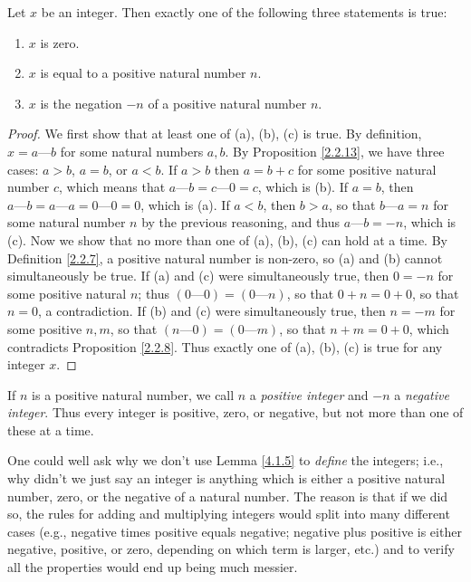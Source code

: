 \begin{lemma}\label{4.1.5}
    Let \(x\) be an integer.
    Then exactly one of the following three statements is true:
    \begin{enumerate}
        \item \(x\) is zero.
        \item \(x\) is equal to a positive natural number \(n\).
        \item \(x\) is the negation \(-n\) of a positive natural number \(n\).
    \end{enumerate}
\end{lemma}

\begin{proof}
    We first show that at least one of (a), (b), (c) is true.
    By definition, \(x = a \text{---} b\) for some natural numbers \(a, b\).
    By Proposition \ref{2.2.13}, we have three cases: \(a > b\), \(a = b\), or \(a < b\).
    If \(a > b\) then \(a = b + c\) for some positive natural number \(c\), which means that \(a \text{---} b = c \text{---} 0 = c\), which is (b).
    If \(a = b\), then \(a \text{---} b = a \text{---} a = 0 \text{---} 0 = 0\), which is (a).
    If \(a < b\), then \(b > a\), so that \(b \text{---} a = n\) for some natural number \(n\) by the previous reasoning, and thus \(a \text{---} b = -n\), which is (c).
    Now we show that no more than one of (a), (b), (c) can hold at a time.
    By Definition \ref{2.2.7}, a positive natural number is non-zero, so (a) and (b) cannot simultaneously be true.
    If (a) and (c) were simultaneously true, then \(0 = -n\) for some positive natural \(n\);
    thus \((0 \text{---} 0) = (0 \text{---} n)\), so that \(0 + n = 0 + 0\), so that \(n = 0\), a contradiction.
    If (b) and (c) were simultaneously true, then \(n = -m\) for some positive \(n, m\), so that \((n \text{---} 0) = (0 \text{---} m)\), so that \(n + m = 0 + 0\), which contradicts Proposition \ref{2.2.8}.
    Thus exactly one of (a), (b), (c) is true for any integer \(x\).
\end{proof}

\begin{note}
    If \(n\) is a positive natural number, we call \(n\) a \emph{positive integer} and \(-n\) a \emph{negative integer}.
    Thus every integer is positive, zero, or negative, but not more than one of these at a time.
\end{note}

\begin{note}
    One could well ask why we don’t use Lemma \ref{4.1.5} to \emph{define} the integers;
    i.e., why didn’t we just say an integer is anything which is either a positive natural number, zero, or the negative of a natural number.
    The reason is that if we did so, the rules for adding and multiplying integers would split into many different cases (e.g., negative times positive equals negative; negative plus positive is either negative, positive, or zero, depending on which term is larger, etc.) and to verify all the properties would end up being much messier.
\end{note}

